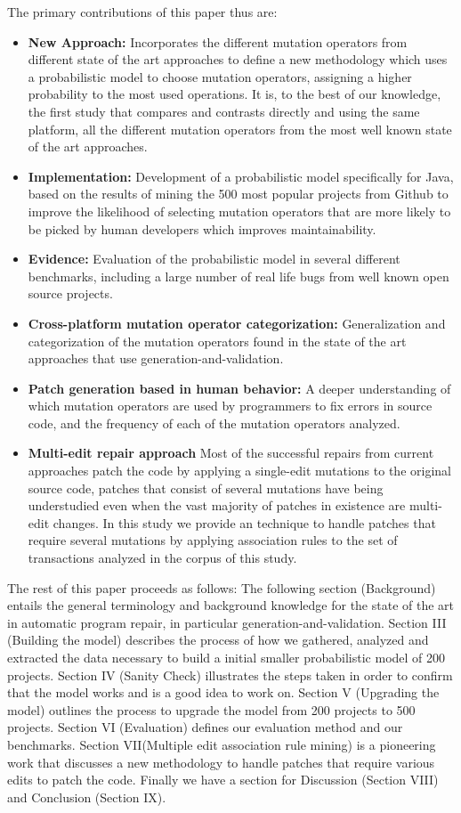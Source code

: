 \documentclass[conference]{IEEEtran}
\begin{document}
The primary contributions of this paper thus are:
\begin{itemize}
  \item \textbf{New Approach:} Incorporates the different mutation operators from different state of the art approaches to define a new methodology which uses a probabilistic model to choose mutation operators, assigning a higher probability to the most used operations. It is, to the best of our knowledge, the first study that compares and contrasts directly and using the same platform, all the different mutation operators from the most well known state of the art approaches. 
  \item \textbf{Implementation:} Development of a probabilistic model specifically for Java, based on the results of mining the 500 most popular projects from Github to improve the likelihood of selecting mutation operators that are more likely to be picked by human developers which improves maintainability.
  \item \textbf{Evidence:} Evaluation of the probabilistic model in several different benchmarks, including a large number of real life bugs from well known open source projects.
  \item \textbf{Cross-platform mutation operator categorization:} Generalization and categorization of the mutation operators found in the state of the art approaches that use generation-and-validation.
  \item \textbf{Patch generation based in human behavior:} A deeper understanding of which mutation operators are used by programmers to fix errors in source code, and the frequency of each of the mutation operators analyzed.
  \item \textbf{Multi-edit repair approach} Most of the successful repairs from current approaches patch the code by applying a single-edit mutations to the original source code, patches that consist of several mutations have being understudied even when the vast majority of patches in existence are multi-edit changes. In this study we provide an technique to handle patches that require several mutations by applying association rules to the set of transactions analyzed in the corpus of this study.  
\end{itemize}

The rest of this paper proceeds as follows:
The following section (Background) entails the general terminology and background knowledge for the state of the art in automatic program repair, in particular generation-and-validation. Section III (Building the model) describes the process of how we gathered, analyzed and extracted the data necessary to build a initial smaller probabilistic model of 200 projects. Section IV (Sanity Check) illustrates the steps taken in order to confirm that the model works and is a good idea to work on. Section V (Upgrading the model) outlines the process to upgrade the model from 200 projects to 500 projects. Section VI (Evaluation) defines our evaluation method and our benchmarks. Section VII(Multiple edit association rule mining) is a pioneering work that discusses a new methodology to handle patches that require various edits to patch the code. Finally we have a section for Discussion (Section VIII) and Conclusion (Section IX).
\end{document}
